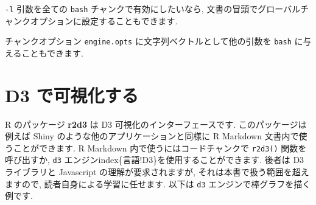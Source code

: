 \documentclass[
  11pt,
]{bxjsreport}
\newenvironment{Shaded}{\begin{snugshade}}{\end{snugshade}}
\newcommand{\AttributeTok}[1]{\textcolor[rgb]{0.77,0.63,0.00}{#1}}
\newcommand{\FunctionTok}[1]{\textcolor[rgb]{0.00,0.00,0.00}{#1}}
\newcommand{\InformationTok}[1]{\textcolor[rgb]{0.56,0.35,0.01}{\textbf{\textit{#1}}}}
\newcommand{\NormalTok}[1]{#1}
\newcommand{\SpecialCharTok}[1]{\textcolor[rgb]{0.00,0.00,0.00}{#1}}
\newcommand{\StringTok}[1]{\textcolor[rgb]{0.31,0.60,0.02}{#1}}
\begin{document}
\begin{Shaded}
\end{Shaded}

\texttt{-l} 引数を全ての \texttt{bash} チャンクで有効にしたいなら, 文書の冒頭でグローバルチャンクオプションに設定することもできます.

\begin{Shaded}
\end{Shaded}

チャンクオプション \texttt{engine.opts} に文字列ベクトルとして他の引数を \texttt{bash} に与えることもできます.

\hypertarget{d3}{%
\section{D3 で可視化する}\label{d3}}

R のパッケージ \textbf{r2d3} \autocite{R-r2d3} は D3 可視化のインターフェースです. このパッケージは例えば Shiny のような他のアプリケーションと同様に R Markdown 文書内で使うことができます. R Markdown 内で使うにはコードチャンクで \texttt{r2d3()} 関数を呼び出すか, \texttt{d3} エンジンindex\{言語!D3\}を使用することができます. 後者は D3 ライブラリと Javascript の理解が要求されますが, それは本書で扱う範囲を超えますので, 読者自身による学習に任せます. 以下は \texttt{d3} エンジンで棒グラフを描く例です.
\end{document}
